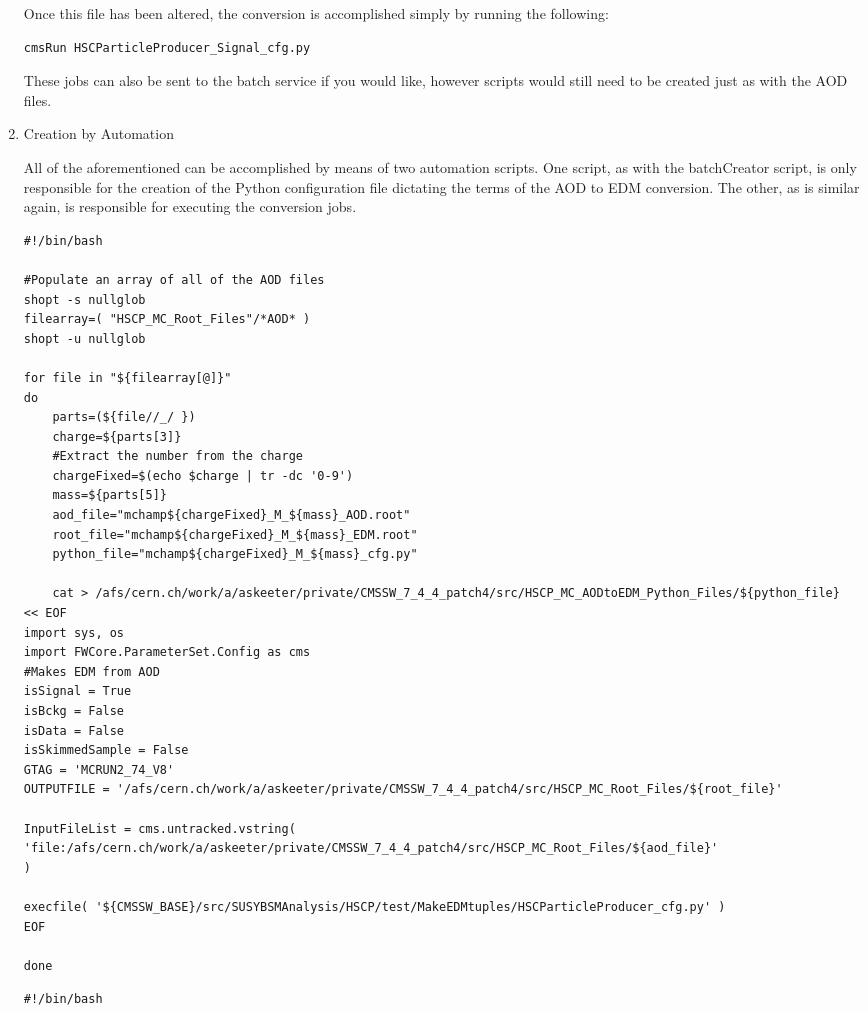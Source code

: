 \documentclass[11pt]{article}
\begin{document}
\begin{enumerate}
Once this file has been altered, the conversion is accomplished
simply by running the following:

\begin{verbatim}
cmsRun HSCParticleProducer_Signal_cfg.py
\end{verbatim}

These jobs can also be sent to the batch service if you would
like, however scripts would still need to be created just as with
the AOD files.

\item Creation by Automation
\label{sec-1-1-3-2}

All of the aforementioned can be accomplished by means of two
automation scripts. One script, as with the batchCreator script,
is only responsible for the creation of the Python configuration
file dictating the terms of the AOD to EDM conversion. The other,
as is similar again, is responsible for executing the conversion
jobs.

\begin{verbatim}
#!/bin/bash

#Populate an array of all of the AOD files
shopt -s nullglob
filearray=( "HSCP_MC_Root_Files"/*AOD* )
shopt -u nullglob

for file in "${filearray[@]}"
do
    parts=(${file//_/ })
    charge=${parts[3]}
    #Extract the number from the charge
    chargeFixed=$(echo $charge | tr -dc '0-9')
    mass=${parts[5]}    
    aod_file="mchamp${chargeFixed}_M_${mass}_AOD.root"
    root_file="mchamp${chargeFixed}_M_${mass}_EDM.root"
    python_file="mchamp${chargeFixed}_M_${mass}_cfg.py"

    cat > /afs/cern.ch/work/a/askeeter/private/CMSSW_7_4_4_patch4/src/HSCP_MC_AODtoEDM_Python_Files/${python_file} << EOF
import sys, os
import FWCore.ParameterSet.Config as cms
#Makes EDM from AOD
isSignal = True
isBckg = False
isData = False
isSkimmedSample = False
GTAG = 'MCRUN2_74_V8'
OUTPUTFILE = '/afs/cern.ch/work/a/askeeter/private/CMSSW_7_4_4_patch4/src/HSCP_MC_Root_Files/${root_file}'

InputFileList = cms.untracked.vstring(
'file:/afs/cern.ch/work/a/askeeter/private/CMSSW_7_4_4_patch4/src/HSCP_MC_Root_Files/${aod_file}'
)

execfile( '${CMSSW_BASE}/src/SUSYBSMAnalysis/HSCP/test/MakeEDMtuples/HSCParticleProducer_cfg.py' )
EOF

done
\end{verbatim}

\begin{verbatim}
#!/bin/bash


\end{verbatim}
\end{enumerate}
\end{document}

